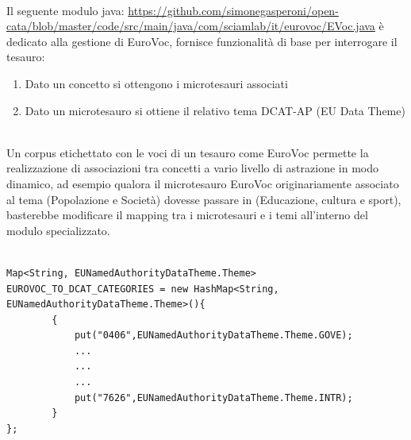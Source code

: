 \documentclass{article}
\theoremstyle{plain}
\theoremstyle{definition}
\begin{document}
\\
Il seguente modulo java: \url{https://github.com/simonegasperoni/open-cata/blob/master/code/src/main/java/com/sciamlab/it/eurovoc/EVoc.java} è dedicato alla gestione di EuroVoc, fornisce funzionalità di base per interrogare il tesauro:
\begin{enumerate}
\item Dato un concetto si ottengono i microtesauri associati
\item Dato un microtesauro si ottiene il relativo tema DCAT-AP (EU Data Theme) 
\end{enumerate}
\phantom
\\
Un corpus etichettato con le voci di un tesauro come EuroVoc permette la realizzazione di associazioni tra concetti a vario livello di astrazione in modo dinamico, ad esempio qualora il microtesauro EuroVoc  originariamente associato al tema  (Popolazione e Società) dovesse passare in  (Educazione, cultura e sport), basterebbe modificare il mapping tra i microtesauri e i temi all'interno del modulo specializzato.
\\
\\
\begin{lstlisting}
Map<String, EUNamedAuthorityDataTheme.Theme> EUROVOC_TO_DCAT_CATEGORIES = new HashMap<String, EUNamedAuthorityDataTheme.Theme>(){
		{
			put("0406",EUNamedAuthorityDataTheme.Theme.GOVE); 		
			...
			...
			...
			put("7626",EUNamedAuthorityDataTheme.Theme.INTR); 	
		}
};
\end{lstlisting}
\phantom
\\
\newpage
\end{document}
